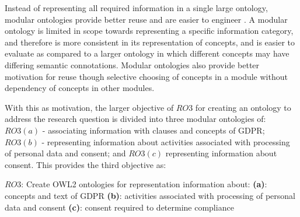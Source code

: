 
Instead of representing all required information in a single large ontology, modular ontologies provide better reuse and are easier to engineer \cite{suarez-figueroa_neon_2012}.
A modular ontology is limited in scope towards representing a specific information category, and therefore is more consistent in its representation of concepts, and is easier to evaluate as compared to a larger ontology in which different concepts may have differing semantic connotations.
Modular ontologies also provide better motivation for reuse though selective choosing of concepts in a module without dependency of concepts in other modules.

With this as motivation, the larger objective of $RO3$ for creating an ontology to address the research question is divided into three modular ontologies of: $RO3(a)$ - associating information with clauses and concepts of GDPR; $RO3(b)$ - representing information about activities associated with processing of personal data and consent; and $RO3(c)$ representing information about consent.
This provides the third objective as:
\begin{framed}
$RO3$: Create OWL2 ontologies for representation information about:
\newline\indent\indent\textbf{(a)}: concepts and text of GDPR
\newline\indent\indent\textbf{(b)}: activities associated with processing of personal data and consent
\newline\indent\indent\textbf{(c)}: consent required to determine compliance
\end{framed}


